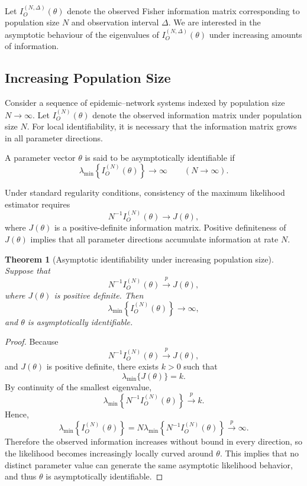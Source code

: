 \documentclass[10pt]{article}
\newtheorem{theorem}{Theorem}
\begin{document}
Let $I_O^{(N,\Delta)}(\theta)$ denote the observed Fisher information matrix corresponding to population size $N$ and observation interval $\Delta$. We are interested in the asymptotic behaviour of the eigenvalues of $I_O^{(N,\Delta)}(\theta)$ under increasing amounts of information.

\subsection{Increasing Population Size}

Consider a sequence of epidemic--network systems indexed by population size $N\rightarrow\infty$. Let $I_O^{(N)}(\theta)$ denote the observed information matrix under population size $N$. For local identifiability, it is necessary that the information matrix grows in all parameter directions.

A parameter vector $\theta$ is said to be asymptotically identifiable if
\[
\lambda_{\min}
\left\{
I_O^{(N)}(\theta)
\right\}
\rightarrow \infty
\qquad
(N\rightarrow\infty).
\]

Under standard regularity conditions, consistency of the maximum likelihood estimator requires
\[
N^{-1}I_O^{(N)}(\theta)
\rightarrow
J(\theta),
\]
where $J(\theta)$ is a positive-definite information matrix. Positive definiteness of $J(\theta)$ implies that all parameter directions accumulate information at rate $N$.

\begin{theorem}[Asymptotic identifiability under increasing population size]
Suppose that
\[
N^{-1}I_O^{(N)}(\theta)
\overset{p}{\longrightarrow}
J(\theta),
\]
where $J(\theta)$ is positive definite. Then
\[
\lambda_{\min}
\left\{
I_O^{(N)}(\theta)
\right\}
\rightarrow\infty,
\]
and $\theta$ is asymptotically identifiable.
\end{theorem}

\begin{proof}
Because
\[
N^{-1}I_O^{(N)}(\theta)\overset{p}{\to}J(\theta),
\]
and \(J(\theta)\) is positive definite, there exists \(k>0\) such that
\[
\lambda_{\min}\{J(\theta)\}=k.
\]
By continuity of the smallest eigenvalue,
\[
\lambda_{\min}\!\left\{N^{-1}I_O^{(N)}(\theta)\right\}\overset{p}{\to}k.
\]
Hence,
\[
\lambda_{\min}\!\left\{I_O^{(N)}(\theta)\right\}
=
N\lambda_{\min}\!\left\{N^{-1}I_O^{(N)}(\theta)\right\}
\overset{p}{\to}\infty.
\]
Therefore the observed information increases without bound in every direction, so the likelihood becomes increasingly locally curved around \(\theta\). This implies that no distinct parameter value can generate the same asymptotic likelihood behavior, and thus \(\theta\) is asymptotically identifiable.
\end{proof}
\end{document}
